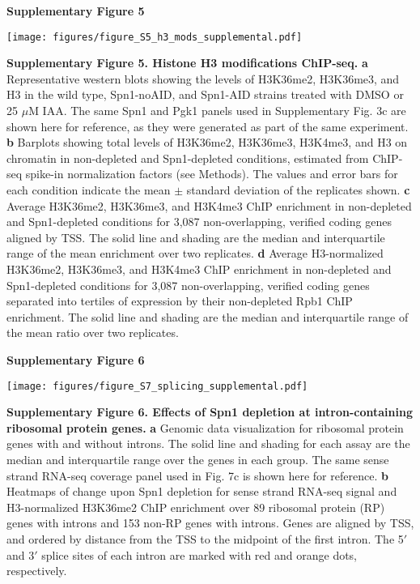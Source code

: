 \documentclass[9pt]{extarticle}
\begin{document}
\newpage

\textbf{\large Supplementary Figure 5}

{\texttt{[image: figures/figure\_S5\_h3\_mods\_supplemental.pdf]}\par}

\textbf{Supplementary Figure 5. Histone H3 modifications ChIP-seq.}
\textbf{a} Representative western blots showing the levels of H3K36me2, H3K36me3, and H3 in the wild type, Spn1-noAID, and Spn1-AID strains treated with DMSO or 25 $\mu$M IAA.
The same Spn1 and Pgk1 panels used in Supplementary Fig. 3c are shown here for reference, as they were generated as part of the same experiment.
\textbf{b} Barplots showing total levels of H3K36me2, H3K36me3, H3K4me3, and H3 on chromatin in non-depleted and Spn1-depleted conditions, estimated from ChIP-seq spike-in normalization factors (see Methods).
The values and error bars for each condition indicate the mean $\pm$ standard deviation of the replicates shown.
\textbf{c} Average H3K36me2, H3K36me3, and H3K4me3 ChIP enrichment in non-depleted and Spn1-depleted conditions for 3,087 non-overlapping, verified coding genes aligned by TSS.
The solid line and shading are the median and interquartile range of the mean enrichment over two replicates.
\textbf{d} Average H3-normalized H3K36me2, H3K36me3, and H3K4me3 ChIP enrichment in non-depleted and Spn1-depleted conditions for 3,087 non-overlapping, verified coding genes separated into tertiles of expression by their non-depleted Rpb1 ChIP enrichment.
The solid line and shading are the median and interquartile range of the mean ratio over two replicates.

\newpage




\textbf{\large Supplementary Figure 6}

{\texttt{[image: figures/figure\_S7\_splicing\_supplemental.pdf]}\par}

\textbf{Supplementary Figure 6. Effects of Spn1 depletion at intron-containing ribosomal protein genes.}
\textbf{a} Genomic data visualization for ribosomal protein genes with and without introns.
The solid line and shading for each assay are the median and interquartile range over the genes in each group.
The same sense strand RNA-seq coverage panel used in Fig. 7c is shown here for reference.
\textbf{b} Heatmaps of change upon Spn1 depletion for sense strand RNA-seq signal and H3-normalized H3K36me2 ChIP enrichment over 89 ribosomal protein (RP) genes with introns and 153 non-RP genes with introns.
Genes are aligned by TSS, and ordered by distance from the TSS to the midpoint of the first intron.
The 5$\prime$ and 3$\prime$ splice sites of each intron are marked with red and orange dots, respectively.

\newpage
\end{document}
